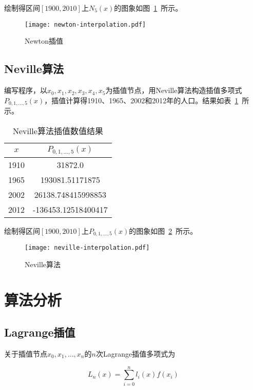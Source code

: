 \documentclass[degree=report, output=electronic]{ustcthesis}
\begin{document}
绘制得区间$[1900,2010]$上$N_5(x)$的图象如图~\ref{fig:newton}~所示。

\begin{figure}[h]
  \centering
  \texttt{[image: newton-interpolation.pdf]}
  \caption{Newton插值}
  \label{fig:newton}
\end{figure}

\subsection{Neville算法}

编写程序，以$x_0,x_1,x_2,x_3,x_4,x_5$为插值节点，用Neville算法构造插值多项式$P_{0,1,\dots,5}(x)$，插值计算得1910、1965、2002和2012年的人口。结果如表~\ref{tab:neville-output}~所示。

\begin{table}[h]
  \centering
  \caption{Neville算法插值数值结果}
  \label{tab:neville-output}
  \begin{tabular}{cc}
    \toprule
    $x$  & $P_{0,1,\dots,5}(x)$ \\
    \midrule
    1910 & 31872.0              \\
    1965 & 193081.51171875      \\
    2002 & 26138.748415998853   \\
    2012 & -136453.12518400417  \\
    \bottomrule
  \end{tabular}
\end{table}

绘制得区间$[1900,2010]$上$P_{0,1,\dots,5}(x)$的图象如图~\ref{fig:neville}~所示。

\begin{figure}[h]
  \centering
  \texttt{[image: neville-interpolation.pdf]}
  \caption{Neville算法}
  \label{fig:neville}
\end{figure}

\section{算法分析}

\subsection{Lagrange插值}

关于插值节点$x_0,x_1,\dots,x_n$的$n$次Lagrange插值多项式为

\begin{equation}
  L_n(x)=\sum_{i=0}^{n}l_i(x)f(x_i)
\end{equation}
\end{document}
